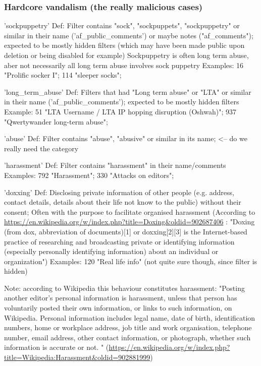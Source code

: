 \subsubsection{Hardcore vandalism (the really malicious cases)}
'sockpuppetry'
  Def: Filter contains "sock", "sockpuppets", "sockpuppetry" or similar in their name ('af\_public\_comments') or maybe notes ("af\_comments"); expected to be mostly hidden filters (which may have been made public upon deletion or being disabled for example)
  Sockpuppetry is often long term abuse, aber not necessarily all long term abuse involves sock puppetry
  Examples: 16 "Prolific socker I"; 114 "sleeper socks";

'long\_term\_abuse'
  Def: Filters that had "Long term abuse" or "LTA" or similar in their name ('af\_public\_comments'); expected to be mostly hidden filters
  Example: 51 "LTA Username / LTA IP hopping disruption (Oshwah)"; 937 "Qwertywander long-term abuse";

'abuse'
  Def: Filter contains "abuse", "abusive" or similar in its name; <-- do we really need the category

'harassment'
  Def: Filter contains "harassment" in their name/comments
  Examples: 792 "Harassment"; 330 "Attacks on editors";

'doxxing'
  Def: Disclosing private information of other people (e.g. address, contact details, details about their life not know to the public) without their consent; Often with the purpose to facilitate organised harassment
  (According to \url{https://en.wikipedia.org/w/index.php?title=Doxing&oldid=902687406} : "Doxing (from dox, abbreviation of documents)[1] or doxxing[2][3] is the Internet-based practice of researching and broadcasting private or identifying information (especially personally identifying information) about an individual or organization")
  Examples: 120 "Real life info" (not quite sure though, since filter is hidden)

Note: according to Wikipedia this behaviour constitutes harassment: "Posting another editor's personal information is harassment, unless that person has voluntarily posted their own information, or links to such information, on Wikipedia. Personal information includes legal name, date of birth, identification numbers, home or workplace address, job title and work organisation, telephone number, email address, other contact information, or photograph, whether such information is accurate or not. " (\url{https://en.wikipedia.org/w/index.php?title=Wikipedia:Harassment&oldid=902881999})


